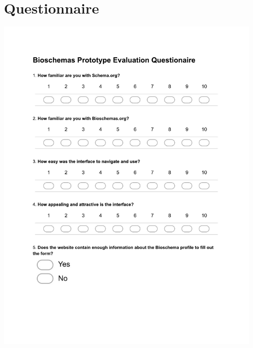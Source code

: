 \section{Questionnaire}\label{chp:prototypeUsabilityQuestionaire}
\vspace*{3.7em}
\begin{centering}
\includegraphics[trim = 40 160 0 60,scale=0.9]{forms/prototypeEvaluationFormPage1.pdf}
\end{centering}

